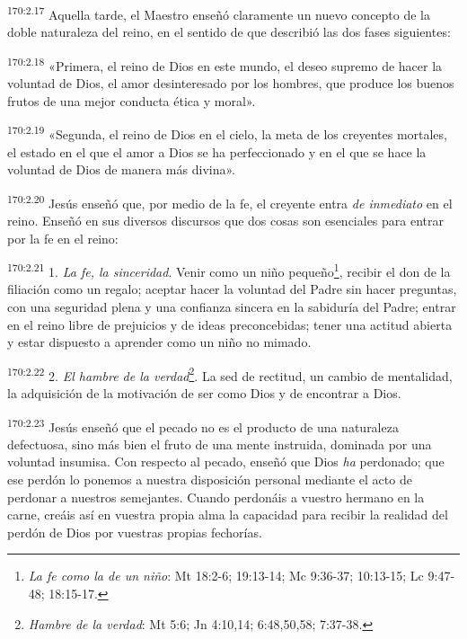 \par
\textsuperscript{170:2.17} Aquella tarde, el Maestro enseñó claramente un nuevo concepto de la doble naturaleza del reino, en el sentido de que describió las dos fases siguientes:

\par
\textsuperscript{170:2.18} «Primera, el reino de Dios en este mundo, el deseo supremo de hacer la voluntad de Dios, el amor desinteresado por los hombres, que produce los buenos frutos de una mejor conducta ética y moral».

\par
\textsuperscript{170:2.19} «Segunda, el reino de Dios en el cielo, la meta de los creyentes mortales, el estado en el que el amor a Dios se ha perfeccionado y en el que se hace la voluntad de Dios de manera más divina».

\par
\textsuperscript{170:2.20} Jesús enseñó que, por medio de la fe, el creyente entra \textit{de inmediato} en el reino. Enseñó en sus diversos discursos que dos cosas son esenciales para entrar por la fe en el reino:

\par
\textsuperscript{170:2.21} 1. \textit{La fe, la sinceridad}. Venir como un niño pequeño\footnote{\textit{La fe como la de un niño}: Mt 18:2-6; 19:13-14; Mc 9:36-37; 10:13-15; Lc 9:47-48; 18:15-17.}, recibir el don de la filiación como un regalo; aceptar hacer la voluntad del Padre sin hacer preguntas, con una seguridad plena y una confianza sincera en la sabiduría del Padre; entrar en el reino libre de prejuicios y de ideas preconcebidas; tener una actitud abierta y estar dispuesto a aprender como un niño no mimado.

\par
\textsuperscript{170:2.22} 2. \textit{El hambre de la verdad}\footnote{\textit{Hambre de la verdad}: Mt 5:6; Jn 4:10,14; 6:48,50,58; 7:37-38.}. La sed de rectitud, un cambio de mentalidad, la adquisición de la motivación de ser como Dios y de encontrar a Dios.

\par
\textsuperscript{170:2.23} Jesús enseñó que el pecado no es el producto de una naturaleza defectuosa, sino más bien el fruto de una mente instruida, dominada por una voluntad insumisa. Con respecto al pecado, enseñó que Dios \textit{ha} perdonado; que ese perdón lo ponemos a nuestra disposición personal mediante el acto de perdonar a nuestros semejantes. Cuando perdonáis a vuestro hermano en la carne, creáis así en vuestra propia alma la capacidad para recibir la realidad del perdón de Dios por vuestras propias fechorías.

